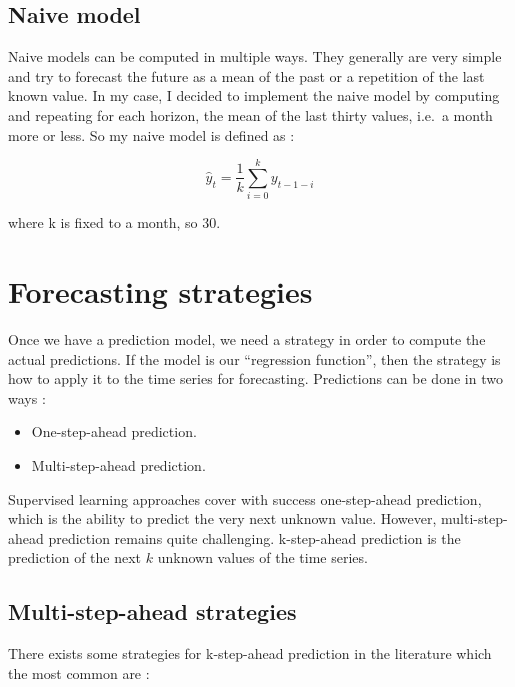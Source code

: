 \documentclass[11pt,a4paper,oneside]{book}
\newenvironment{myitemize}
{ \begin{itemize}
    \setlength\itemsep{0pt}}
{ \end{itemize}                  }
\begin{document}
\subsection{Naive model}

Naive models can be computed in multiple ways. They generally are very simple and try to forecast the future as a mean of the past or a repetition of the last known value. In my case, I decided to implement the naive model by computing and repeating for each horizon, the mean of the last thirty values, i.e.\ a month more or less. So my naive model is defined as : 

\begin{equation}
\hat{y}_t = \frac{1}{k} \sum_{i=0}^{k} y_{t-1-i}
\end{equation}

where k is fixed to a month, so 30.


\section{Forecasting strategies}\label{strat}

Once we have a prediction model, we need a strategy in order to compute the actual predictions. If the model is our ``regression function'', then the strategy is how to apply it to the time series for forecasting. Predictions can be done in two ways :

\begin{myitemize}
    \item One-step-ahead prediction.
    \item Multi-step-ahead prediction.
\end{myitemize}

Supervised learning approaches cover with success one-step-ahead prediction, which is the ability to predict the very next unknown value. However, multi-step-ahead prediction remains quite challenging.  k-step-ahead prediction is the prediction of the next $k$ unknown values of the time series. 

\subsection{Multi-step-ahead strategies}

There exists some strategies for k-step-ahead prediction in the literature which the most common are \cite{Bonte}\cite{taiebonte}:
\end{document}
